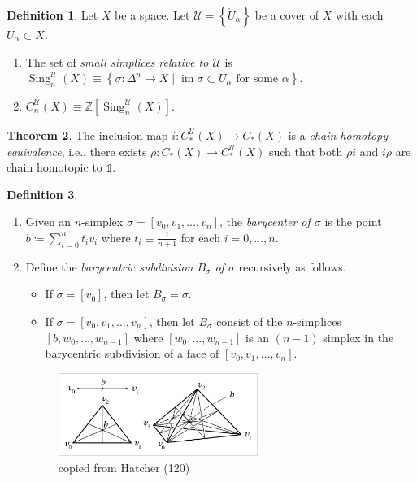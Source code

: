 \documentclass[10pt,letterpaper,cm]{nupset}
\theoremstyle{definition}
\newtheorem{definition}{Definition}[subsection]
\theoremstyle{theorem}
\newtheorem{theorem}[definition]{Theorem}
\theoremstyle{remark}
\newcommand{\U}{\mathcal U}
\newcommand{\Z}{\mathbb Z}
\newcommand{\1}{\mathbb{1}}
\newcommand{\0}{\vec 0}
\DeclareMathOperator{\im}{im}
\DeclareMathOperator{\sing}{Sing}
\begin{document}
\begin{definition} Let $X$ be a space. Let $\mathcal{U} =\left\{\mathring{U}_{\alpha}\right\}$ be a cover of $X$ with each $U_{\alpha} \subset X$.
\begin{enumerate}
\item The set of  \textit{small simplices relative to $\U$} is $\sing_n^{\U}(X) \equiv \left\{\sigma : \Delta^n  \to X \mid \im{\sigma}\subset U_{\alpha} \text{ for some }\alpha\right\}$.
\item $C_n^{\U}(X) \equiv\Z\left[\sing_n^{\U}(X)\right]$.
\end{enumerate}
\end{definition}

\begin{theorem}
The inclusion map $i: C_{\ast}^{\U}(X) \to C_{\ast}(X)$ is a \textit{chain homotopy equivalence}, i.e., there exists $\rho : C_{\ast}(X) \to C_{\ast}^{\U}(X)$ such that both  $\rho i$ and  $i \rho$ are chain homotopic to $\1$.
\end{theorem}

\begin{definition} $ $
\begin{enumerate}
\item Given an $n$-simplex $\sigma = \left[v_0, v_1, \ldots, v_n\right]$, the \textit{barycenter of $\sigma$} is the point $b\coloneqq  \sum_{i=0}^n t_iv_i$ where $t_i \equiv \frac{1}{n+1}$ for each $i=0, \ldots, n$.
\item Define the \textit{barycentric subdivision $B_{\sigma}$ of $\sigma$} recursively as follows.
\begin{itemize}
\item If $\sigma = \left[v_0\right]$, then let $B_{\sigma} = \sigma$.
\item If $\sigma = \left[v_0, v_1, \ldots, v_n\right]$, then let $B_{\sigma}$ consist of the $n$-simplices $\left[b, w_0, \ldots, w_{n-1}\right]$ where $\left[w_0, \ldots, w_{n-1}\right]$ is an $\left(n-1\right)$ simplex in the barycentric subdivision of a face of $\left[v_0, v_1, \ldots, v_n\right]$.
\end{itemize}
\begin{figure}[H]
\centering
\includegraphics[width=65mm]{Hatcher-barycentric.png}
\caption{copied from Hatcher (120) \label{overflow}}
\end{figure}
\end{enumerate}
\end{definition}
\end{document}
